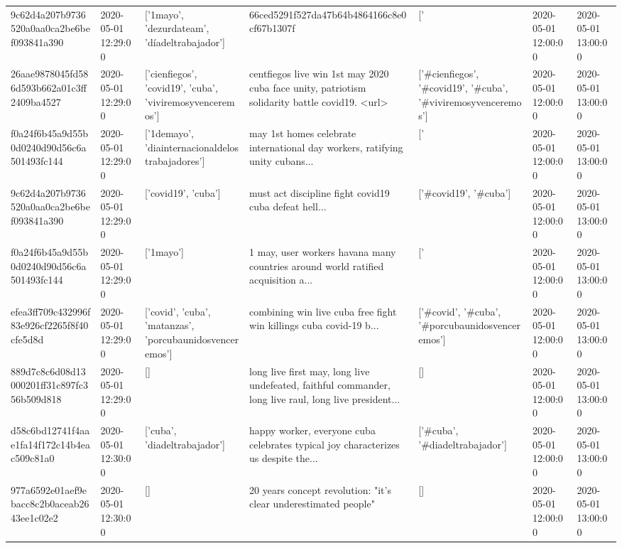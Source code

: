 \begin{tabular}{lllllll}
9c62d4a207b9736520a0aa0ca2be6bef093841a390 & 2020-05-01 12:29:00 & ['1mayo', 'dezurdateam', 'díadeltrabajador'] & 66ced5291f527da47b64b4864166c8e0cf67b1307f & ['#1mayo', '#dezurdateam', '#díadeltrabajador'] & 2020-05-01 12:00:00 & 2020-05-01 13:00:00 \\
26aae9878045fd586d593b662a01c3ff2409ba4527 & 2020-05-01 12:29:00 & ['cienfiegos', 'covid19', 'cuba', 'viviremosyvenceremos'] & centfiegos live win 1st may 2020 cuba face unity, patriotism solidarity battle covid19. <url> & ['#cienfiegos', '#covid19', '#cuba', '#viviremosyvenceremos'] & 2020-05-01 12:00:00 & 2020-05-01 13:00:00 \\
f0a24f6b45a9d55b0d0240d90d56c6a501493fc144 & 2020-05-01 12:29:00 & ['1demayo', 'diainternacionaldelostrabajadores'] & may 1st homes celebrate international day workers, ratifying unity cubans... & ['#1demayo', '#diainternacionaldelostrabajadores'] & 2020-05-01 12:00:00 & 2020-05-01 13:00:00 \\
9c62d4a207b9736520a0aa0ca2be6bef093841a390 & 2020-05-01 12:29:00 & ['covid19', 'cuba'] & must act discipline fight covid19 cuba defeat hell... & ['#covid19', '#cuba'] & 2020-05-01 12:00:00 & 2020-05-01 13:00:00 \\
f0a24f6b45a9d55b0d0240d90d56c6a501493fc144 & 2020-05-01 12:29:00 & ['1mayo'] & 1 may, user workers havana many countries around world ratified acquisition a... & ['#1mayo'] & 2020-05-01 12:00:00 & 2020-05-01 13:00:00 \\
efea3ff709c432996f83e926cf2265f8f40cfe5d8d & 2020-05-01 12:29:00 & ['covid', 'cuba', 'matanzas', 'porcubaunidosvenceremos'] & combining win live cuba free fight win killings cuba covid-19 b... & ['#covid', '#cuba', '#porcubaunidosvenceremos'] & 2020-05-01 12:00:00 & 2020-05-01 13:00:00 \\
889d7c8c6d08d13000201ff31c897fc356b509d818 & 2020-05-01 12:29:00 & [] & long live first may, long live undefeated, faithful commander, long live raul, long live president... & [] & 2020-05-01 12:00:00 & 2020-05-01 13:00:00 \\
d58c6bd12741f4aae1fa14f172c14b4eac509c81a0 & 2020-05-01 12:30:00 & ['cuba', 'diadeltrabajador'] & happy worker, everyone cuba celebrates typical joy characterizes us despite the... & ['#cuba', '#diadeltrabajador'] & 2020-05-01 12:00:00 & 2020-05-01 13:00:00 \\
977a6592e01aef9ebacc8c2b0aceab2643ee1c02e2 & 2020-05-01 12:30:00 & [] & 20 years concept revolution: "it's clear underestimated people" & [] & 2020-05-01 12:00:00 & 2020-05-01 13:00:00 \\

\end{tabular}
